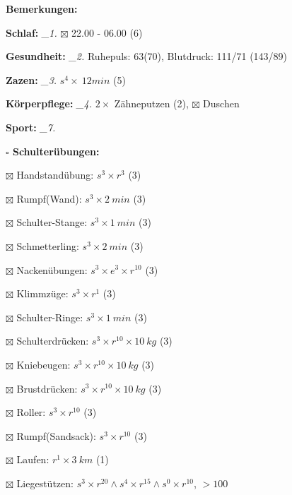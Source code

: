 \documentclass[10pt,a4paper]{article}
\newcommand\prop[1] {{\color {alizarin} {\bf #1}}}        %
\newcommand\mand[1] {{\color {burntorange} {\bf #1}}}     %
\newcommand\topspace{\vskip -15pt \hskip 20pt}
\newcommand\n[1] { {\sl #1.} \hskip 5pt }
\begin{document}
\begin{mdframed}[style=daystyle]
  \begin{labeling}{{\mand {Bemerkungen:}}}
    \setlength\itemsep{-3pt}
  \item[{\mand {Schlaf:}}]        \n{\_1} $\boxtimes$ 22.00 - 06.00 (6)
  \item[{\mand {Gesundheit:}}]    \n{\_2} Ruhepuls: 63(70), Blutdruck: 111/71 (143/89)
  \item[{\mand {Zazen:}}]         \n{\_3} $s^4 \times\ 12 min$ (5)
  \item[{\mand {Körperpflege:}}]  \n{\_4} $2 \times$ Zähneputzen (2), $\boxtimes$ Duschen
  \item[{\mand {Sport:}}]         \n{\_7}
    \topspace
    \begin{minipage}{0.75\textwidth}  
      \begin{labeling}{\prop {$\square$ {Schulterübungen:}}} 
        \setlength\itemsep{-3pt}
      \item[$\boxtimes$ Handstandübung:]  $s^3 \times r^{3}$ (3)
      \item[$\boxtimes$ Rumpf(Wand):]     $s^3 \times 2\ min$ (3)
      \item[$\boxtimes$ Schulter-Stange:] $s^3 \times 1\ min$ (3)
      \item[$\boxtimes$ Schmetterling:]   $s^3 \times 2\ min$ (3)
      \item[$\boxtimes$ Nackenübungen:]   $s^3 \times e^3 \times r^{10}$ (3)
      \item[$\boxtimes$ Klimmzüge:]       $s^3 \times r^1$ (3)
      \item[$\boxtimes$ Schulter-Ringe:]  $s^3 \times 1\ min$ (3)
      \item[$\boxtimes$ Schulterdrücken:] $s^3 \times r^{10} \times 10\ kg$ (3)
      \item[$\boxtimes$ Kniebeugen:]      $s^3 \times r^{10} \times 10\ kg$ (3)
      \item[$\boxtimes$ Brustdrücken:]    $s^3 \times r^{10} \times 10\ kg$ (3)
      \item[$\boxtimes$ Roller:]          $s^3 \times r^{10}$ (3)
      \item[$\boxtimes$ Rumpf(Sandsack):] $s^3 \times r^{10}$ (3)
      \item[$\boxtimes$ Laufen:]          $r^1 \times 3\ km$ (1)
      \item[$\boxtimes$ Liegestützen:]    $s^3 \times r^{20} \land s^4 \times r^{15} \land s^0 \times r^{10}$, $> 100$
      \end{labeling}

\end{minipage}
\end{labeling}
\end{mdframed}
\end{document}
